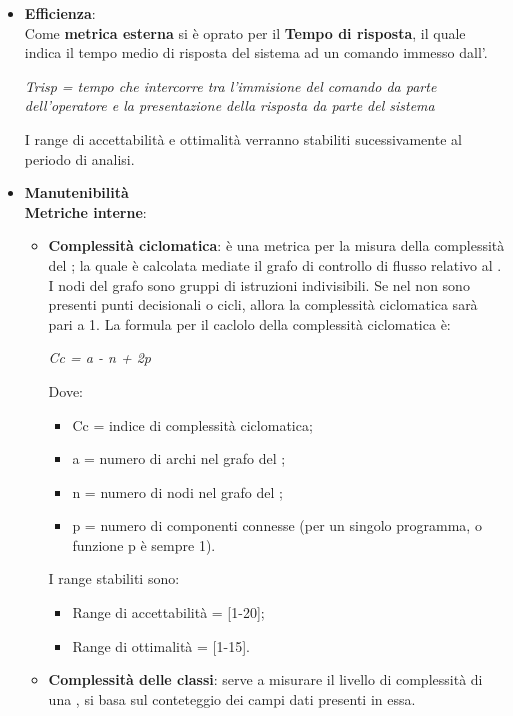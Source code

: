 \begin{itemize}
      \item \textbf{Efficienza}:\\
      Come \textbf{metrica esterna} si è oprato per il \textbf{Tempo di risposta},
      il quale indica il tempo medio di risposta del sistema ad un comando immesso dall'.
      \begin{center}
        \emph{Trisp = tempo che intercorre tra l'immisione del comando da parte dell'operatore e la presentazione della risposta da parte del sistema}
      \end{center}
      I range di accettabilità e ottimalità verranno stabiliti sucessivamente al periodo di analisi.
      \item \textbf{Manutenibilità}\\
        \textbf{Metriche interne}:
        \begin{itemize}
          \item \textbf{Complessità ciclomatica}: è una metrica per la misura della complessità del ; la quale è calcolata mediate il grafo di controllo di flusso relativo al .
            I nodi del grafo sono gruppi di istruzioni indivisibili. Se nel  non sono presenti punti decisionali o cicli, allora la complessità ciclomatica sarà pari a 1. La formula per il caclolo della complessità ciclomatica è:
            \begin{center}
              \emph{Cc = a - n + 2p}
            \end{center}
            Dove:
            \begin{itemize}
              \item Cc = indice di complessità ciclomatica;
              \item a = numero di archi nel grafo del ;
              \item n = numero di nodi nel grafo del ;
              \item p = numero di componenti connesse (per un singolo programma,  o funzione p è sempre 1).
            \end{itemize}
            I range stabiliti sono:
            \begin{itemize}
              \item Range di accettabilità = [1-20];
              \item Range di ottimalità = [1-15].
            \end{itemize}
          \item \textbf{Complessità delle classi}: serve a misurare il livello di complessità di una , si basa sul conteteggio dei campi dati presenti in essa.

\end{itemize}
\end{itemize}
